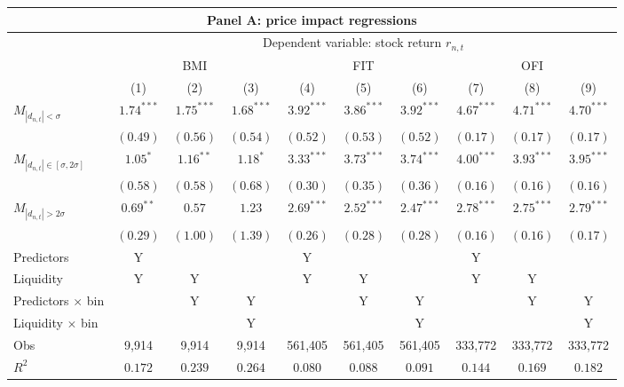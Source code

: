 \begin{tabular}{lccccccccc}
  \hline \multicolumn{10}{c}{Panel A: price impact regressions} \\
 \hline 
                                    & \multicolumn{9}{c}{Dependent variable: stock return $r_{n,t}$} \\

                                    \cmidrule(l){2-10} & \multicolumn{3}{c}{BMI} & \multicolumn{3}{c}{FIT} & \multicolumn{3}{c}{OFI} \\
 \cmidrule(l){2-4} \cmidrule(l){5-7} \cmidrule(l){8-10} 
  & (1) & (2) & (3) & (4) & (5) & (6) & (7) & (8) & (9) \\ 
  $M_{|d_{n,t}| < \sigma}$ & $1.74^{***}$ & $1.75^{***}$ & $1.68^{***}$ & $3.92^{***}$ & $3.86^{***}$ & $3.92^{***}$ & $4.67^{***}$ & $4.71^{***}$ & $4.70^{***}$ \\ 
   & $(0.49)$ & $(0.56)$ & $(0.54)$ & $(0.52)$ & $(0.53)$ & $(0.52)$ & $(0.17)$ & $(0.17)$ & $(0.17)$ \\ 
  $M_{|d_{n,t}| \in [\sigma, 2\sigma]}$ & $1.05^{*}$ & $1.16^{**}$ & $1.18^{*}$ & $3.33^{***}$ & $3.73^{***}$ & $3.74^{***}$ & $4.00^{***}$ & $3.93^{***}$ & $3.95^{***}$ \\ 
   & $(0.58)$ & $(0.58)$ & $(0.68)$ & $(0.30)$ & $(0.35)$ & $(0.36)$ & $(0.16)$ & $(0.16)$ & $(0.16)$ \\ 
  $M_{|d_{n,t}| > 2 \sigma}$ & $0.69^{**}$ & $0.57$ & $1.23$ & $2.69^{***}$ & $2.52^{***}$ & $2.47^{***}$ & $2.78^{***}$ & $2.75^{***}$ & $2.79^{***}$ \\ 
   \vspace{5pt} & $(0.29)$ & $(1.00)$ & $(1.39)$ & $(0.26)$ & $(0.28)$ & $(0.28)$ & $(0.16)$ & $(0.16)$ & $(0.17)$ \\ 
  Predictors & Y &  &  & Y &  &  & Y &  &  \\ 
  Liquidity & Y & Y &  & Y & Y &  & Y & Y &  \\ 
  Predictors $\times$ bin &  & Y & Y &  & Y & Y &  & Y & Y \\ 
   \vspace{5pt}Liquidity $\times$ bin &  &  & Y &  &  & Y &  &  & Y \\ 
  Obs & 9,914 & 9,914 & 9,914 & 561,405 & 561,405 & 561,405 & 333,772 & 333,772 & 333,772 \\ 
  $R^2$ & $0.172$ & $0.239$ & $0.264$ & $0.080$ & $0.088$ & $0.091$ & $0.144$ & $0.169$ & $0.182$ \\ 

\end{tabular}
